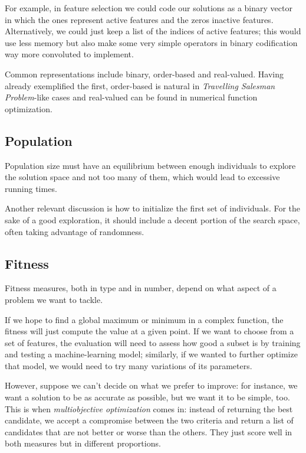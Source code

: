 		For example, in feature selection we could code our solutions as a binary vector in which the ones represent active features and the zeros inactive features. Alternatively, we could just keep a list of the indices of active features; this would use less memory but also make some very simple operators in binary codification way more convoluted to implement.

		Common representations include binary, order-based and real-valued. Having already exemplified the first, order-based is natural in \textit{Travelling Salesman Problem}-like cases and real-valued can be found in numerical function optimization.

	\subsection{Population}

		Population size must have an equilibrium between enough individuals to explore the solution space and not too many of them, which would lead to excessive running times.

		Another relevant discussion is how to initialize the first set of individuals. For the sake of a good exploration, it should include a decent portion of the search space, often taking advantage of randomness.

	\subsection{Fitness}

		Fitness measures, both in type and in number, depend on what aspect of a problem we want to tackle. 

		If we hope to find a global maximum or minimum in a complex function, the fitness will just compute the value at a given point. If we want to choose from a set of features, the evaluation will need to assess how good a subset is by training and testing a machine-learning model; similarly, if we wanted to further optimize that model, we would need to try many variations of its parameters.

		However, suppose we can't decide on what we prefer to improve: for instance, we want a solution to be as accurate as possible, but we want it to be simple, too. This is when \textit{multiobjective optimization} comes in: instead of returning the best candidate, we accept a compromise between the two criteria and return a list of candidates that are not better or worse than the others. They just score well in both measures but in different proportions.

